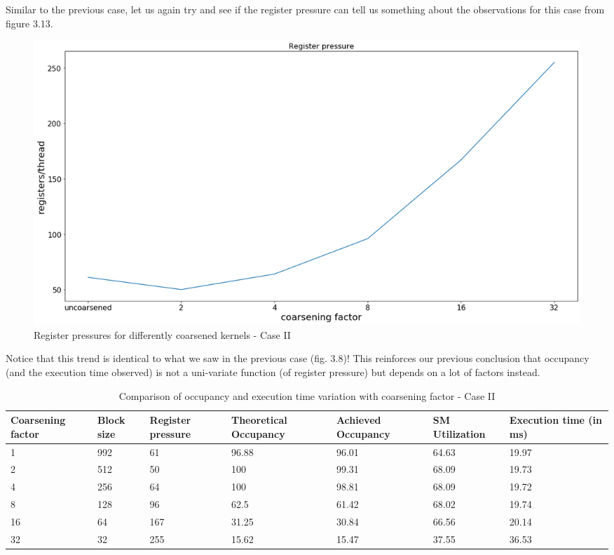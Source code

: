 Similar to the previous case, let us again try and see if the register pressure can tell us something about the observations for this case from figure 3.13.

\begin{figure}[ht]
	\centering
	\includegraphics[scale=0.30]{Pictures/plots/poor_improvement/reg pressure.png}
	\caption{\small Register pressures for differently coarsened kernels - Case II}
\end{figure}

Notice that this trend is identical to what we saw in the previous case (fig. 3.8)! This reinforces our previous conclusion that occupancy (and the execution time observed) is not a uni-variate function (of register pressure) but depends on a lot of factors instead.

\begin{table}[ht]
    \centering
    
    \begin{tabular}{ |p{2cm}|p{1.5cm}|p{1.5cm}|p{2cm}|p{2cm}|p{2cm}|p{2cm}|  }
         \hline
         Coarsening factor & Block size & Register pressure & Theoretical Occupancy & Achieved Occupancy & SM Utilization & Execution time (in ms) \\
         \hline
         
         1                  & 992 & 61 & 96.88 & 96.01 & 64.63 & 19.97\\
         2                  & 512 & 50 & 100 & 99.31 & 68.09 & 19.73\\
         4                  & 256 & 64 & 100 & 98.81 & 68.09 & 19.72\\
         8                  & 128 & 96 & 62.5 & 61.42 & 68.02 & 19.74\\
         16                 & 64 & 167 & 31.25 & 30.84 & 66.56 & 20.14\\
         32                 & 32 & 255 & 15.62 & 15.47 & 37.55 & 36.53\\
         \hline
    \end{tabular}
    \caption{\small Comparison of occupancy and execution time variation with coarsening factor - Case II}
    \label{tab:block_size_good_coarsen}
\end{table}

